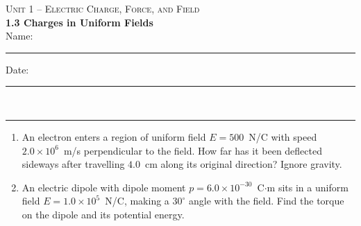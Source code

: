 \documentclass[11pt,letterpaper]{article}
\begin{document}
{\small\textsc{Unit 1 -- Electric Charge, Force, and Field}}\\[2pt]{\Large\bfseries 1.3 Charges in Uniform Fields}\\[8pt]Name: \rule{2.4in}{0.4pt} \hfill Date: \rule{1.4in}{0.4pt}\\[4pt]\hrule\vspace{10pt}{\small\itshape Placeholder worksheet for the site prototype. Free for classroom use.}\vspace{6pt}
\begin{enumerate}[leftmargin=*,itemsep=10pt]
\item An electron enters a region of uniform field $E = 500$~N/C with speed $2.0\times10^{6}$~m/s perpendicular to the field. How far has it been deflected sideways after travelling $4.0$~cm along its original direction? Ignore gravity.
\vspace{2.2in}
\item An electric dipole with dipole moment $p = 6.0\times10^{-30}$~C$\cdot$m sits in a uniform field $E = 1.0\times10^{5}$~N/C, making a $30^\circ$ angle with the field. Find the torque on the dipole and its potential energy.
\vspace{2.2in}
\end{enumerate}
\end{document}
